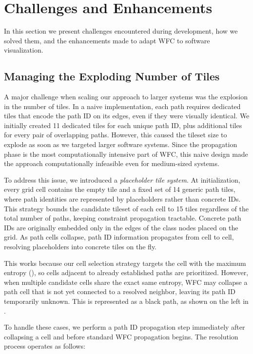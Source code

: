 \documentclass[../../main.tex]{subfiles}
\begin{document}
\section{Challenges and Enhancements}
In this section we present challenges encountered during development, how we solved them, and the enhancements made to adapt WFC to software visualization.

\subsection{Managing the Exploding Number of Tiles}
A major challenge when scaling our approach to larger systems was the explosion in the number of tiles. In a naive implementation, each path requires dedicated tiles that encode the path ID on its edges, even if they were visually identical. We initially created 11 dedicated tiles for each unique path ID, plus additional tiles for every pair of overlapping paths. However, this caused the tileset size to explode as soon as we targeted larger software systems. Since the propagation phase is the most computationally intensive part of WFC, this naive design made the approach computationally infeasible even for medium-sized systems.

To address this issue, we introduced a \emph{placeholder tile system}. At initialization, every grid cell contains the empty tile and a fixed set of 14 generic path tiles, where path identities are represented by placeholders rather than concrete IDs. This strategy bounds the candidate tileset of each cell to 15 tiles regardless of the total number of paths, keeping constraint propagation tractable. Concrete path IDs are originally embedded only in the edges of the class nodes placed on the grid. As path cells collapse, path ID information propagates from cell to cell, resolving placeholders into concrete tiles on the fly.

This works because our cell selection strategy targets the cell with the maximum entropy (), so cells adjacent to already established paths are prioritized. However, when multiple candidate cells share the exact same entropy, WFC may collapse a path cell that is not yet connected to a resolved neighbor, leaving its path ID temporarily unknown. This is represented as a black path, as shown on the left in  .

To handle these cases, we perform a path ID propagation step immediately after collapsing a cell and before standard WFC propagation begins. The resolution process operates as follows:
\end{document}
